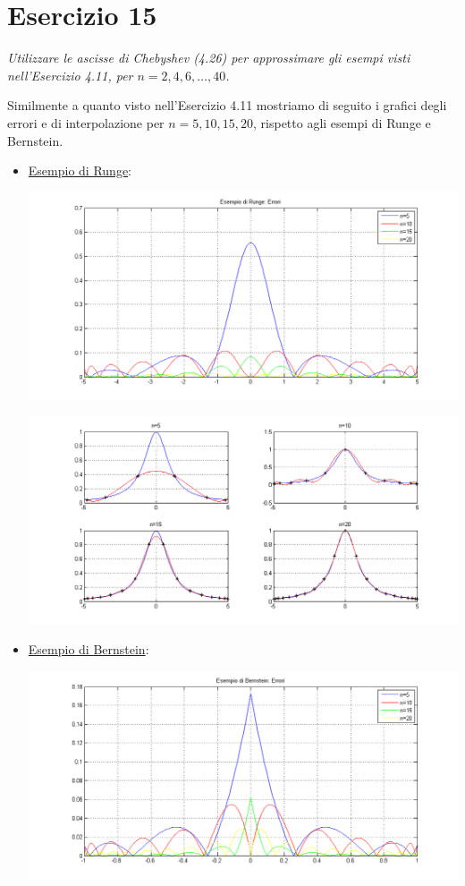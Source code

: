 \section{Esercizio 15}
\label{sub:Esercizio 15}
\emph{Utilizzare le ascisse di Chebyshev (4.26) per approssimare gli esempi visti nell'Esercizio 4.11, per $n=2,4,6,\dots,40$.}
\begin{sol}
	Similmente a quanto visto nell'Esercizio 4.11 mostriamo di seguito i grafici degli errori e di interpolazione per $n=5,10,15,20$,
	rispetto agli esempi di Runge e Bernstein.
	\begin{itemize}
		\item \underline{Esempio di Runge}:
			\begin{center}
				\includegraphics[scale=0.4]{img/es4_15a.png}
			\end{center}
			\begin{center}
				\includegraphics[scale=0.4]{img/es4_15b.png}
			\end{center}
		\item \underline{Esempio di Bernstein}:
			\begin{center}
				\includegraphics[scale=0.4]{img/es4_15c.png}

\end{center}
\end{itemize}
\end{sol}
